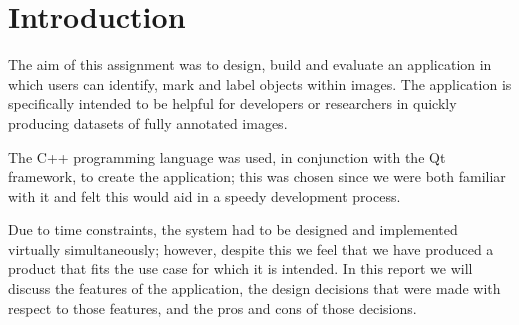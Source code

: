 \section{Introduction}
The aim of this assignment was to design, build and evaluate an application in which users can identify, mark and label objects within images.  The application is specifically intended to be helpful for developers or researchers in quickly producing datasets of fully annotated images.

The C++ programming language was used, in conjunction with the Qt framework, to create the application; this was chosen since we were both familiar with it and felt this would aid in a speedy development process.

Due to time constraints, the system had to be designed and implemented virtually simultaneously; however, despite this we feel that we have produced a product that fits the use case for which it is intended.  In this report we will discuss the features of the application, the design decisions that were made with respect to those features, and the pros and cons of those decisions.